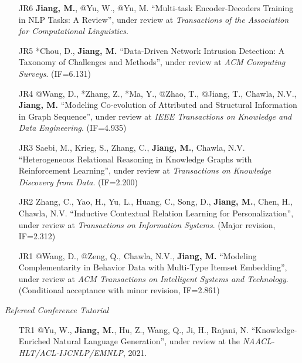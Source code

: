 \documentclass[10pt]{article}
\newenvironment{myindentpar}[1]%
{\begin{list}{}%
         {\setlength{\leftmargin}{#1}}%
         \item[]%
}
{\end{list}}
\newcounter{list}
\begin{document}
\begin{myindentpar}{0.00cm}
\begin{enumerate}[leftmargin=.5cm]
\item[JR6] \textbf{Jiang, M.}, @Yu, W., @Yu, M. ``Multi-task Encoder-Decoders Training in NLP Tasks: A Review'', under review at \textit{Transactions of the Association for Computational Linguistics}.
		
\item[JR5] *Chou, D., \textbf{Jiang, M.} ``Data-Driven Network Intrusion Detection: A Taxonomy of Challenges and Methods'', under review at \textit{ACM Computing Surveys}. (IF=6.131)

\item[JR4] @Wang, D., *Zhang, Z., *Ma, Y., @Zhao, T., @Jiang, T., Chawla, N.V., \textbf{Jiang, M.} ``Modeling Co-evolution of Attributed and Structural Information in Graph Sequence'', under review at \textit{IEEE Transactions on Knowledge and Data Engineering}. (IF=4.935)

\item[JR3] Saebi, M., Krieg, S., Zhang, C., \textbf{Jiang, M.}, Chawla, N.V. ``Heterogeneous Relational Reasoning in Knowledge Graphs with Reinforcement Learning'', under review at \textit{Transactions on Knowledge Discovery from Data}. (IF=2.200)
	
\item[JR2] Zhang, C., Yao, H., Yu, L., Huang, C., Song, D., \textbf{Jiang, M.}, Chen, H., Chawla, N.V. ``Inductive Contextual Relation Learning for Personalization'', under review at \textit{Transactions on Information Systems}. (Major revision, IF=2.312)
	
\item[JR1] @Wang, D., @Zeng, Q., Chawla, N.V., \textbf{Jiang, M.} ``Modeling Complementarity in Behavior Data with Multi-Type Itemset Embedding'', under review at \textit{ACM Transactions on Intelligent Systems and Technology}. (Conditional acceptance with minor revision, IF=2.861)

\end{enumerate}




\vspace{.2cm}\hspace{-0.25cm}\textit{Refereed Conference Tutorial}

\begin{enumerate}[leftmargin=.5cm]

\item[TR1] @Yu, W., \textbf{Jiang, M.}, Hu, Z., Wang, Q., Ji, H., Rajani, N. ``Knowledge-Enriched Natural Language Generation'', under review at the \textit{NAACL-HLT/ACL-IJCNLP/EMNLP}, 2021.

\end{enumerate}

\end{myindentpar}
\end{document}
